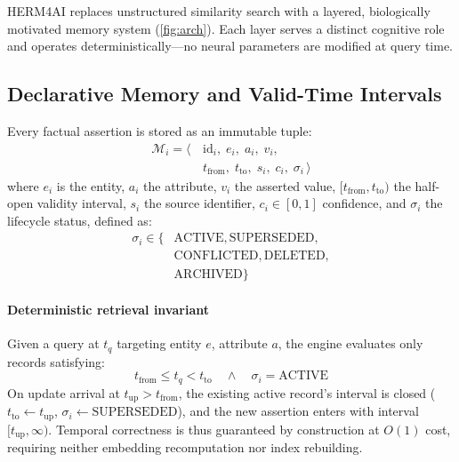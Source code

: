 \documentclass[11pt,a4paper,twocolumn]{article}
\newcommand{\herm}{\textsc{HERM4AI}}
\begin{document}
\herm{} replaces unstructured similarity search with a layered,
biologically motivated memory system (\cref{fig:arch}).  Each layer
serves a distinct cognitive role and operates deterministically---no
neural parameters are modified at query time.

\subsection{Declarative Memory and Valid-Time Intervals}
\label{sec:vt}

Every factual assertion is stored as an immutable tuple:
\begin{equation}
\begin{aligned}
\mathcal{M}_i = \langle\, &\text{id}_i,\; e_i,\; a_i,\; v_i,\\
& t_{\text{from}},\; t_{\text{to}},\; s_i,\; c_i,\; \sigma_i \,\rangle
\end{aligned}
\label{eq:tuple}
\end{equation}
where $e_i$ is the entity, $a_i$ the attribute, $v_i$ the asserted
value, $[t_{\text{from}}, t_{\text{to}})$ the half-open validity
interval, $s_i$ the source identifier, $c_i \in [0,1]$ confidence,
and $\sigma_i$ the lifecycle status, defined as:
\begin{equation}
\begin{aligned}
\sigma_i \in \{&\text{ACTIVE},\text{SUPERSEDED},\\
              &\text{CONFLICTED},\text{DELETED},\\
              &\text{ARCHIVED}\}
\end{aligned}
\label{eq:lifecycle}
\end{equation}

\paragraph{Deterministic retrieval invariant}
Given a query at $t_q$ targeting entity $e$, attribute $a$, the engine
evaluates only records satisfying:
\begin{equation}
  t_{\text{from}} \le t_q < t_{\text{to}} \quad\land\quad
  \sigma_i = \text{ACTIVE}
  \label{eq:invariant}
\end{equation}
On update arrival at $t_{\text{up}} > t_{\text{from}}$, the existing
active record's interval is closed ($t_{\text{to}} \leftarrow
t_{\text{up}}$, $\sigma_i \leftarrow \text{SUPERSEDED}$), and the new
assertion enters with interval $[t_{\text{up}}, \infty)$.  Temporal
correctness is thus guaranteed by construction at $O(1)$ cost,
requiring neither embedding recomputation nor index rebuilding.
\end{document}
